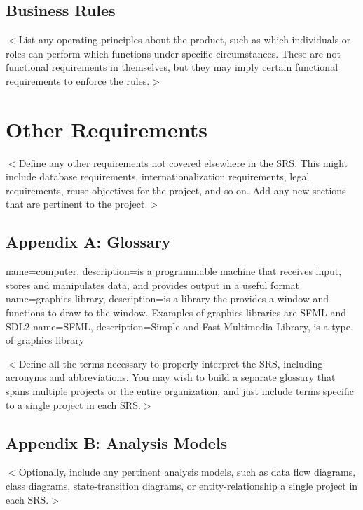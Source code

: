 \documentclass{scrreprt}
\begin{document}
\section{Business Rules}
$<$List any operating principles about the product, such as which individuals or 
roles can perform which functions under specific circumstances. These are not 
functional requirements in themselves, but they may imply certain functional 
requirements to enforce the rules.$>$


\chapter{Other Requirements}
$<$Define any other requirements not covered elsewhere in the SRS. This might 
include database requirements, internationalization requirements, legal 
requirements, reuse objectives for the project, and so on. Add any new sections 
that are pertinent to the project.$>$

\section{Appendix A: Glossary}

{
  name=computer,
  description={is a programmable machine that receives input,
               stores and manipulates data, and provides
               output in a useful format}
}
{
  name=graphics library,
  description={is a library the provides a window and functions to draw to the window.  Examples of graphics libraries are SFML and SDL2}
}
{
  name=SFML,
  description={Simple and Fast Multimedia Library, is a type of graphics library}
}



\renewcommand{\glossarysection}[2][]{} %
\printglossaries

$<$Define all the terms necessary to properly interpret the SRS, including 
acronyms and abbreviations. You may wish to build a separate glossary that spans 
multiple projects or the entire organization, and just include terms specific to 
a single project in each SRS.$>$

\section{Appendix B: Analysis Models}
$<$Optionally, include any pertinent analysis models, such as data flow 
diagrams, class diagrams, state-transition diagrams, or entity-relationship 
a single project in each SRS.$>$
\end{document}
